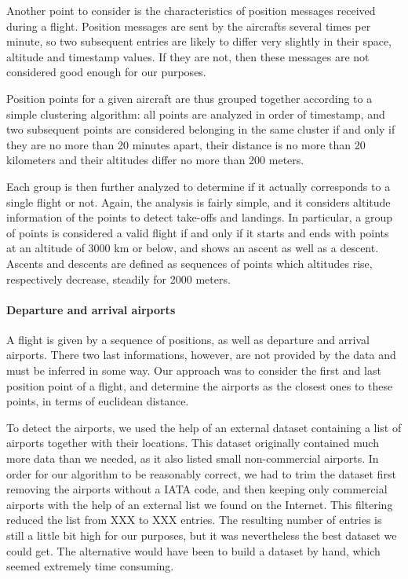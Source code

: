 \documentclass{vldb}
\begin{document}
Another point to consider is the characteristics of position messages received
during a flight. Position messages are sent by the aircrafts several times per
minute, so two subsequent entries are likely to differ very slightly in their
space, altitude and timestamp values. If they are not, then these messages are
not considered good enough for our purposes.

Position points for a given aircraft are thus grouped together according to a
simple clustering algorithm: all points are analyzed in order of timestamp, and
two subsequent points are considered belonging in the same cluster if and only
if they are no more than 20 minutes apart, their distance is no more than 20
kilometers and their altitudes differ no more than 200 meters.

Each group is then further analyzed to determine if it actually corresponds to a
single flight or not. Again, the analysis is fairly simple, and it considers
altitude information of the points to detect take-offs and landings. In
particular, a group of points is considered a valid flight if and only if it
starts and ends with points at an altitude of 3000 km or below, and shows an
ascent as well as a descent. Ascents and descents are defined as sequences of
points which altitudes rise, respectively decrease, steadily for 2000 meters.

\paragraph{Departure and arrival airports}

A flight is given by a sequence of positions, as well as departure and arrival
airports. There two last informations, however, are not provided by the data and
must be inferred in some way. Our approach was to consider the first and last
position point of a flight, and determine the airports as the closest ones to
these points, in terms of euclidean distance.

To detect the airports, we used the help of an external dataset containing a
list of airports together with their locations. This dataset originally
contained much more data than we needed, as it also listed small non-commercial
airports. In order for our algorithm to be reasonably correct, we had to trim
the dataset first removing the airports without a IATA code, and then keeping
only commercial airports with the help of an external list we found on the
Internet. This filtering reduced the list from XXX to XXX entries.
The resulting number of entries is still a little bit high for our purposes, but
it was nevertheless the best dataset we could get. The alternative would have
been to build a dataset by hand, which seemed extremely time consuming.
\end{document}
